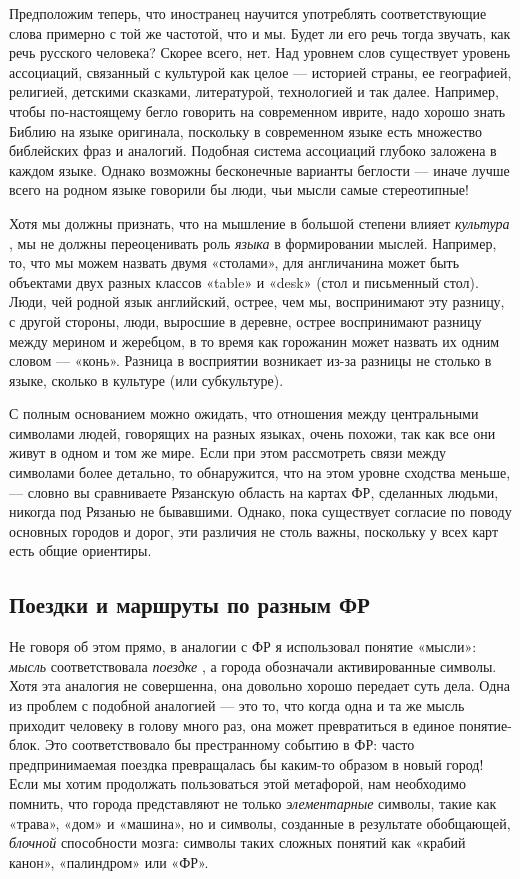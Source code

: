 \documentclass[../main.tex]{subfiles}
\begin{document}
Предположим теперь, что иностранец научится употреблять соответствующие слова примерно с той же частотой, что и мы. Будет ли его речь тогда звучать, как речь русского человека? Скорее всего, нет. Над уровнем слов существует уровень ассоциаций, связанный с культурой как целое --- историей страны, ее географией, религией, детскими сказками, литературой, технологией и так далее. Например, чтобы по-настоящему бегло говорить на современном иврите, надо хорошо знать Библию на языке оригинала, поскольку в современном языке есть множество библейских фраз и аналогий. Подобная система ассоциаций глубоко заложена в каждом языке. Однако возможны бесконечные варианты беглости --- иначе лучше всего на родном языке говорили бы люди, чьи мысли самые стереотипные!

Хотя мы должны признать, что на мышление в большой степени влияет \emph{культура} , мы не должны переоценивать роль \emph{языка} в формировании мыслей. Например, то, что мы можем назвать двумя «столами», для англичанина может быть объектами двух разных классов «table» и «desk» (стол и письменный стол). Люди, чей родной язык английский, острее, чем мы, воспринимают эту разницу, с другой стороны, люди, выросшие в деревне, острее воспринимают разницу между мерином и жеребцом, в то время как горожанин может назвать их одним словом --- «конь». Разница в восприятии возникает из-за разницы не столько в языке, сколько в культуре (или субкультуре).

С полным основанием можно ожидать, что отношения между центральными символами людей, говорящих на разных языках, очень похожи, так как все они живут в одном и том же мире. Если при этом рассмотреть связи между символами более детально, то обнаружится, что на этом уровне сходства меньше, --- словно вы сравниваете Рязанскую область на картах ФР, сделанных людьми, никогда под Рязанью не бывавшими. Однако, пока существует согласие по поводу основных городов и дорог, эти различия не столь важны, поскольку у всех карт есть общие ориентиры.


\subsection{Поездки и маршруты по разным ФР}

Не говоря об этом прямо, в аналогии с ФР я использовал понятие «мысли»: \emph{мысль} соответствовала \emph{поездке} , а города обозначали активированные символы. Хотя эта аналогия не совершенна, она довольно хорошо передает суть дела. Одна из проблем с подобной аналогией --- это то, что когда одна и та же мысль приходит человеку в голову много раз, она может превратиться в единое понятие-блок. Это соответствовало бы престранному событию в ФР: часто предпринимаемая поездка превращалась бы каким-то образом в новый город! Если мы хотим продолжать пользоваться этой метафорой, нам необходимо помнить, что города представляют не только \emph{элементарные} символы, такие как «трава», «дом» и «машина», но и символы, созданные в результате обобщающей, \emph{блочной} способности мозга: символы таких сложных понятий как «крабий канон», «палиндром» или «ФР».
\end{document}
